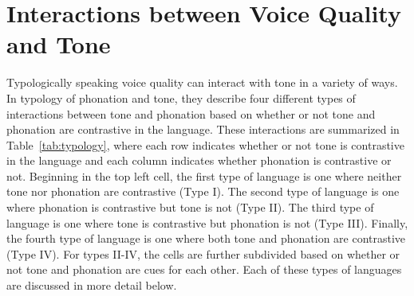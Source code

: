 \section{Interactions between Voice Quality and Tone} \label{sec:interactions_between_voice_quality_and_tone}

Typologically speaking voice quality can interact with tone in a variety of ways. In  typology of phonation and tone, they describe four different types of interactions between tone and phonation based on whether or not tone and phonation are contrastive in the language. These interactions are summarized in Table~\ref{tab:typology}, where each row indicates whether or not tone is contrastive in the language and each column indicates whether phonation is contrastive or not. Beginning in the top left cell, the first type of language is one where neither tone nor phonation are contrastive (Type I). The second type of language is one where phonation is contrastive but tone is not (Type II). The third type of language is one where tone is contrastive but phonation is not (Type III). Finally, the fourth type of language is one where both tone and phonation are contrastive (Type IV). For types II-IV, the cells are further subdivided based on whether or not tone and phonation are cues for each other. Each of these types of languages are discussed in more detail below.


